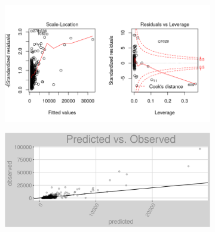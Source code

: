 \begin{figure}[h]
\centering
\begin{subfigure}{1\textwidth}
\centering
\includegraphics[width=.99\textwidth, height=0.475\textheight]{Images/fuel_oil_rf_res_2.png}
\end{subfigure}
\begin{subfigure}{1\textwidth}
\centering
\includegraphics[width=.99\textwidth, height=0.3\textheight]{Images/fuel_oil_rf_pvo.png}
\end{subfigure}
\end{figure}
\FloatBarrier
\newpage
